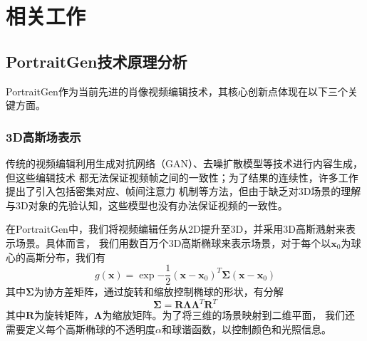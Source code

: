 
\chapter{相关工作}

\section{PortraitGen技术原理分析}

PortraitGen作为当前先进的肖像视频编辑技术，其核心创新点体现在以下三个关键方面。

\subsection{3D高斯场表示}

传统的视频编辑利用生成对抗网络（GAN）、去噪扩散模型等技术进行内容生成，但这些编辑技术
都无法保证视频帧之间的一致性；为了结果的连续性，许多工作提出了引入包括密集对应、帧间注意力
机制等方法，但由于缺乏对3D场景的理解与3D对象的先验认知，这些模型也没有办法保证视频的一致性。

在PortraitGen中，我们将视频编辑任务从2D提升至3D，并采用3D高斯溅射来表示场景。具体而言，
我们用数百万个3D高斯椭球来表示场景，对于每个以$\symbf{x}_0$为球心的高斯分布，我们有
\begin{equation}
    g(\symbf{x})=\exp{-\frac{1}{2}(\symbf{x}-\symbf{x}_0)^T\symbf{\Sigma}(\symbf{x}-\symbf{x}_0)}
\end{equation}
其中$\symbf{\Sigma}$为协方差矩阵，通过旋转和缩放控制椭球的形状，有分解
\begin{equation}
    \symbf{\Sigma}=\symbf{R}\symbf{\Lambda}\symbf{\Lambda}^T\symbf{R}^T
\end{equation}
其中$\symbf{R}$为旋转矩阵，$\symbf{\Lambda}$为缩放矩阵。为了将三维的场景映射到二维平面，
我们还需要定义每个高斯椭球的不透明度$\alpha$和球谐函数，以控制颜色和光照信息。

